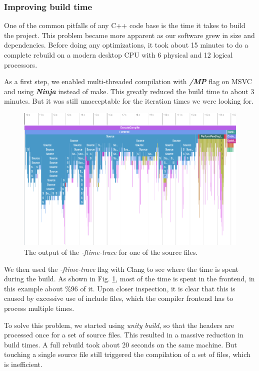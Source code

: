 \documentclass[runningheads]{llncs}
\begin{document}
\subsubsection{Improving build time}
One of the common pitfalls of any C++ code base is the time it takes to build the project. This problem became more apparent as our software grew in size and dependencies. Before doing any optimizations, it took about 15 minutes to do a complete rebuild on a modern desktop CPU with 6 physical and 12 logical processors.

As a first step, we enabled multi-threaded compilation with \textbf{\textit{/MP}} flag on MSVC and using \textbf{\textit{Ninja}} \cite{ref_ninja} instead of make. This greatly reduced the build time to about 3 minutes. But it was still unacceptable for the iteration times we were looking for.

\begin{figure}
	\centering
	\includegraphics[width=\textwidth]{images/time-trace.png}
	\caption{The output of the \textit{-ftime-trace} for one of the source files.}
	\label{fig:time-trace}
\end{figure}

We then used the \textit{-ftime-trace} flag with Clang to see where the time is spent during the build. As shown in Fig. \ref{fig:time-trace}, most of the time is spent in the frontend, in this example about \%96 of it. Upon closer inspection, it is clear that this is caused by excessive use of include files, which the compiler frontend has to process multiple times.

To solve this problem, we started using \textit{unity build}, so that the headers are processed once for a set of source files. This resulted in a massive reduction in build times. A full rebuild took about 20 seconds on the same machine. But touching a single source file still triggered the compilation of a set of files, which is inefficient.
\end{document}
